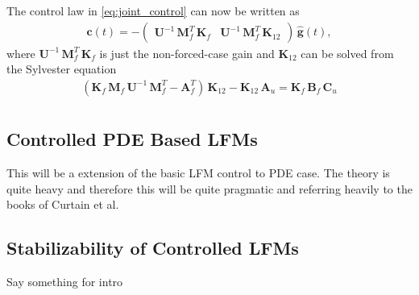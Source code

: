 \documentclass[journal]{IEEEtran}
\newcommand{\simo}[1]{{\color{red}#1}}
\begin{document}
The control law in \eqref{eq:joint_control} can now be written as
%
\begin{equation}
\begin{split}
  \mathbf{c}(t) = - \begin{pmatrix}
    \mathbf{U}^{-1} \, \mathbf{M}_f^T \, \mathbf{K}_{f} &
    \mathbf{U}^{-1} \, \mathbf{M}_f^T \, \mathbf{K}_{12}
  \end{pmatrix} \, \hat{\mathbf{g}}(t),
\end{split}
\label{eq:joint_control2}
\end{equation}
%
where $\mathbf{U}^{-1} \, \mathbf{M}_f^T \, \mathbf{K}_{f}$ is just the non-forced-case gain and $\mathbf{K}_{12}$ can be solved from the Sylvester equation
%
\begin{equation}
\begin{split}
  \left( \mathbf{K}_{f} \, \mathbf{M}_f \, \mathbf{U}^{-1} \, \mathbf{M}_f^T 
         - \mathbf{A}_f^T \right) \, \mathbf{K}_{12}  - \mathbf{K}_{12} \, \mathbf{A}_u
    = \mathbf{K}_{f} \, \mathbf{B}_f \, \mathbf{C}_u \\
\end{split}
\end{equation}


\subsection{Controlled PDE Based LFMs}
%
\simo{This will be a extension of the basic LFM control to PDE case. The theory is quite heavy and therefore this will be quite pragmatic and referring heavily to the books of Curtain et al.}

\subsection{Stabilizability of Controlled LFMs}
%
\simo{Say something for intro}
\end{document}
